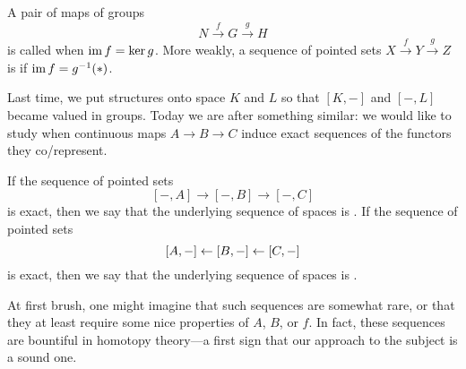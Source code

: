\begin{definition}
A pair of maps of groups \[N \xrightarrow f G \xrightarrow g H\] is called  when $\operatorname{im} f = \ker g$.
More weakly, a sequence of pointed sets $X \xrightarrow f Y \xrightarrow g Z$ is  if $\operatorname{im} f = g^{-1}(*)$.
\end{definition}

\noindent
Last time, we put structures onto space $K$ and $L$ so that $[K, -]$ and $[-, L]$ became valued in groups.
Today we are after something similar: we would like to study when continuous maps $A \to B \to C$ induce exact sequences of the functors they co/represent.

\begin{definition}
If the sequence of pointed sets \[[-, A] \to [-, B] \to [-, C]\] is exact, then we say that the underlying sequence of spaces is .
If the sequence of pointed sets \[[A, -] \leftarrow [B, -] \leftarrow [C, -]\] is exact, then we say that the underlying sequence of spaces is .%
\end{definition}

At first brush, one might imagine that such sequences are somewhat rare, or that they at least require some nice properties of $A$, $B$, or $f$.%
In fact, these sequences are bountiful in homotopy theory---a first sign that our approach to the subject is a sound one.

